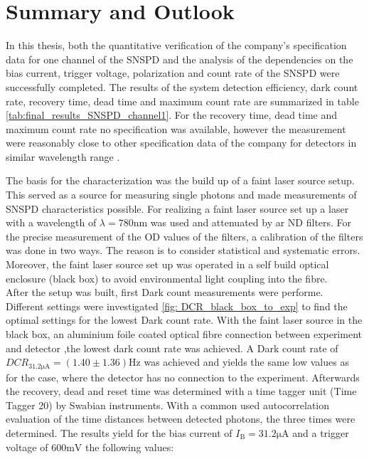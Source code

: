 
\chapter{Summary and Outlook}
\label{sec:Summary_and_Outlook}

In this thesis, both the quantitative verification of the company's specification data for one channel of the SNSPD
and the analysis of the dependencies on the bias current, trigger voltage, polarization and count rate of the SNSPD
were successfully completed.
The results of the system detection efficiency, dark count rate, recovery time,  dead time and maximum count rate are summarized in table \ref{tab:final_results_SNSPD_channel1}.
For the recovery time, dead time and maximum count rate no specification was available, however the measurement were reasonably close to other specification data of the company
for detectors in similar wavelength range \cite{singlequantum_eos}.


The basis for the characterization was the build up of a faint laser source setup.
This served as a source for measuring single photons and made measurements of SNSPD
characteristics possible.
For realizing a faint laser source set up a laser with a wavelength of $\lambda = 780\si{\nano \m}$ was used and
attenuated by ar ND filters.
For the precise measurement of the OD values of the filters, a calibration of the filters was done in two ways.
The reason is to consider statistical and systematic errors.
Moreover, the faint laser source set up was operated in a self build optical enclosure (black box) to avoid
environmental light coupling into the fibre.\\

After the setup was built, first Dark count measurements were performe.
Different settings were investigated \ref{fig: DCR_black_box_to_exp} to find the optimal settings for the lowest Dark count rate.
With the faint laser source in the black box, an aluminium foile coated optical fibre connection between experiment and detector
,the lowest dark count rate was achieved.
A Dark count rate of $DCR_{31.2\si{\micro \A}} = (1.40 \pm 1.36) \si{\Hz}$ was achieved and yields the same low values as for
the case, where the detector has no connection to the experiment.
Afterwards the recovery, dead and reset time was determined with a time tagger unit (Time Tagger 20) by Swabian instruments.
With a common used autocorrelation evaluation \cite{autebert-2020,miki-2017} of the time distances between detected photons,
the three times were determined.
The results yield for the bias current of $I_{\text{B}} = 31.2\si{\micro \A}$ and
a trigger voltage of 600$\si{\milli \V}$ the following values:

